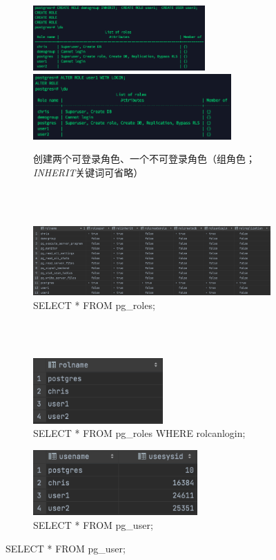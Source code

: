 \begin{figure}[!h]
	\centering
	\begin{subfigure}[b]{0.8\textwidth}
		\centerline{\includegraphics[height=2.5cm]{./pic/role1.png}\quad \includegraphics[height=2.5cm]{./pic/role2.png}}
		\caption{创建两个可登录角色、一个不可登录角色（组角色；\emph{INHERIT}关键词可省略）}
	\end{subfigure}
	\\~\\
	\begin{subfigure}[b]{0.8\textwidth}
		\centerline{\includegraphics[width=\textwidth]{./pic/pgr.png}}
		\caption{SELECT * FROM  pg\_roles;}
	\end{subfigure}
	\\~\\
	\hspace{-2.3cm}
	\begin{subfigure}[b]{0.5\textwidth}
		\centerline{\includegraphics[height=2.5cm]{./pic/pgrw.png}}
		\caption{SELECT * FROM pg\_roles WHERE rolcanlogin;}
	\end{subfigure}
	\quad
	\begin{subfigure}[b]{0.3\textwidth}
		\vspace{-2.5cm}
		\centerline{\includegraphics[height=2.5cm]{./pic/pgu.png}}
		\caption{SELECT * FROM  pg\_user;}
	\end{subfigure}
\end{figure}

